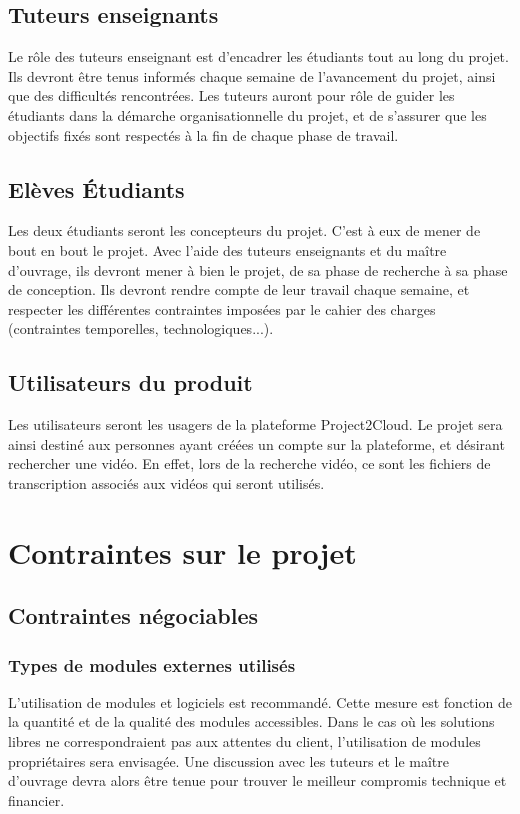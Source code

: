 		\section{Tuteurs enseignants}
		Le rôle des tuteurs enseignant est d'encadrer les étudiants tout au long du projet. Ils devront être tenus informés chaque semaine de l'avancement du projet, ainsi que des difficultés rencontrées. Les tuteurs auront pour rôle de guider les étudiants dans la démarche organisationnelle du projet, et de s'assurer que les objectifs fixés sont respectés à la fin de chaque phase de travail.

		\section{Elèves Étudiants}
		Les deux étudiants seront les concepteurs du projet. C'est à eux de mener de bout en bout le projet. Avec l'aide des tuteurs enseignants et du maître d'ouvrage, ils devront mener à bien le projet, de sa phase de recherche à sa phase de conception. Ils devront rendre compte de leur travail chaque semaine, et respecter les différentes contraintes imposées par le cahier des charges (contraintes temporelles, technologiques...). 

		\section{Utilisateurs du produit}
		Les utilisateurs seront les usagers de la plateforme Project2Cloud. Le projet sera ainsi destiné aux personnes ayant créées un compte sur la plateforme, et désirant rechercher une vidéo. En effet, lors de la recherche vidéo, ce sont les fichiers de transcription associés aux vidéos qui seront utilisés. 


	\chapter{Contraintes sur le projet}

		\section{Contraintes négociables}
			\subsection{Types de modules externes utilisés}	
			L'utilisation de modules et logiciels  est recommandé. Cette mesure est fonction de la quantité et de la qualité des modules accessibles. Dans le cas où les solutions libres ne correspondraient pas aux attentes du client, l'utilisation de modules propriétaires sera envisagée. Une discussion avec les tuteurs et le maître d'ouvrage devra alors être tenue pour trouver le meilleur compromis technique et financier. 

